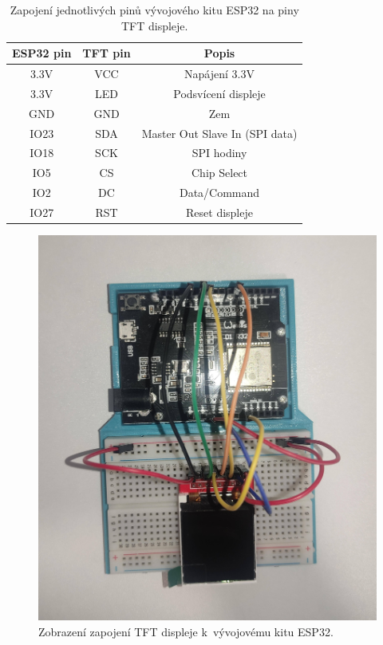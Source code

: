 \begin{table}[h!]
    \centering
    \begin{tabular}{|c|c|c|}
        \hline
        \textbf{ESP32 pin}  & \textbf{TFT pin} & \textbf{Popis} \\
        \hline
        3.3V                & VCC              & Napájení 3.3V \\
        \hline
        3.3V                & LED              & Podsvícení displeje \\
        \hline
        GND                 & GND              & Zem \\
        \hline
        IO23                & SDA              & Master Out Slave In (SPI data) \\
        \hline
        IO18                & SCK              & SPI hodiny \\
        \hline
        IO5                 & CS               & Chip Select  \\
        \hline
        IO2                 & DC               & Data/Command \\
        \hline
        IO27                & RST              & Reset displeje \\
        \hline
    \end{tabular}
    \caption{Zapojení jednotlivých pinů vývojového kitu ESP32 na piny TFT displeje.}
    \label{tab:esp32_tft_piny}
\end{table}

\begin{figure}[h!]
    \centering
    \includegraphics[width=0.7\linewidth]{obrazky-figures/wiring.jpg}
    \caption{Zobrazení zapojení TFT displeje k~vývojovému kitu ESP32.}
    \label{fig:zapojeni}
\end{figure}

